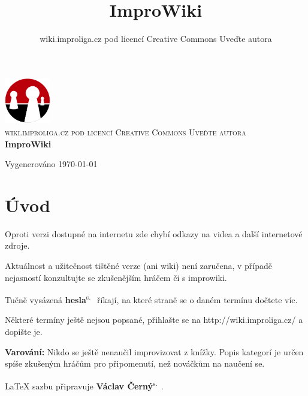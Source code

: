\documentclass[a4paper,10pt,openany]{book}
\title{ImproWiki}
\author{wiki.improliga.cz pod licencí Creative Commons Uveďte autora}
\newcommand{\odkaz}[2]{ \textbf{#1}\textsuperscript{s.~\pageref{#2}}}
\begin{document}
\begin{titlepage}
\begin{center}

\includegraphics[width=0.15\textwidth]{./logo}~\\[5cm]

\textsc{\Large wiki.improliga.cz pod licencí Creative Commons Uveďte autora }\\[0.5cm]

{ \huge \bfseries ImproWiki \\[0.4cm] }



\vfill

{\large Vygenerováno \today}

\end{center}




\end{titlepage}
 
\chapter{Úvod}\label{úvod}

 

Oproti verzi dostupné na internetu zde chybí odkazy na videa a další internetové zdroje.

Aktuálnost a užitečnost tištěné verze (ani wiki) není zaručena, v případě nejasností konzultujte se zkušenějším hráčem či s improwiki.

Tučně vysázená \odkaz{hesla}{úvod} říkají, na které straně se o daném termínu dočtete víc.

Některé termíny ještě nejsou popsané, přihlašte se na http://wiki.improliga.cz/ a dopište je.

\textbf{Varování:} Nikdo se ještě nenaučil improvizovat z knížky. Popis kategorí je určen spíše zkušeným hráčům pro připomenutí, než nováčkům na naučení se.  

\LaTeX{} sazbu připravuje  \odkaz{Václav Černý}{uživatel:vatoz}.
\end{document}
